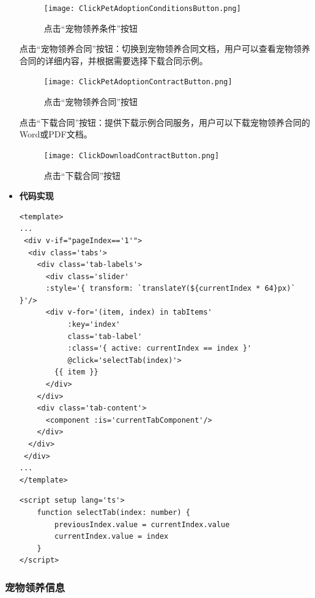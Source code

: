 \begin{itemize}
	\begin{figure}[H]
		\centering
		\texttt{[image: ClickPetAdoptionConditionsButton.png]} 
		\caption{点击“宠物领养条件”按钮}
		\label{fig:Click pet adoption conditions button}
	\end{figure}
	
	点击“宠物领养合同”按钮：切换到宠物领养合同文档，用户可以查看宠物领养合同的详细内容，并根据需要选择下载合同示例。
	
	\begin{figure}[H]
		\centering
		\texttt{[image: ClickPetAdoptionContractButton.png]} 
		\caption{点击“宠物领养合同”按钮}
		\label{fig:Click pet adoption contract button}
	\end{figure}
	
	点击“下载合同”按钮：提供下载示例合同服务，用户可以下载宠物领养合同的Word或PDF文档。
	
	\begin{figure}[H]
		\centering
		\texttt{[image: ClickDownloadContractButton.png]} 
		\caption{点击“下载合同”按钮}
		\label{fig:Click download contract button}
	\end{figure}
	
	\item[] \textbf{代码实现}
	\begin{verbatim}
<template>
...
 <div v-if="pageIndex=='1'">
  <div class='tabs'>
    <div class='tab-labels'>
      <div class='slider' 
      :style='{ transform: `translateY(${currentIndex * 64}px)` }'/>
      <div v-for='(item, index) in tabItems'
           :key='index'
           class='tab-label'
           :class='{ active: currentIndex == index }'
           @click='selectTab(index)'>
        {{ item }}
      </div>
    </div>
    <div class='tab-content'>
      <component :is='currentTabComponent'/>
    </div>
  </div>
 </div>
...
</template>
	\end{verbatim}
	
	\begin{verbatim}
<script setup lang='ts'>
	function selectTab(index: number) {
		previousIndex.value = currentIndex.value
		currentIndex.value = index
	}
</script>
	\end{verbatim}
\end{itemize}

\subsubsection{宠物领养信息}

